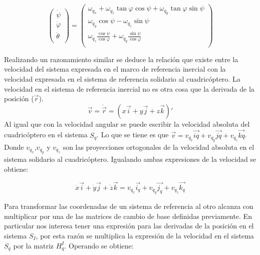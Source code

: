 \documentclass[main]{subfiles}
\begin{document}
\begin{equation}
\left(\begin{array}{c}
\dot{\psi}\\
\dot{\varphi}\\
\dot{\theta}\\
\end{array}\right)=\left(\begin{array}{c}
\omega_{q_x} + \omega_{q_z}\tan\varphi \cos\psi + \omega_{q_y}\tan\varphi \sin\psi\\
\omega_{q_y}\cos \psi - \omega_{q_z}\sin\psi\\
\omega_{q_z} \frac{\cos\psi}{\cos\varphi}  + \omega_{q_y}\frac{\sin\psi}{\cos\varphi} \\
\end{array}\right)
\label{eq:euler}
\end{equation}

Realizando un razonamiento similar se deduce la relaci\'on que existe entre la velocidad del sistema expresada en el marco de referencia inercial con la velocidad expresada en el sistema de referencia solidario al cuadric\'optero. La velocidad en el sistema de referencia inercial no es otra cosa que la derivada de la posici\'on ($\vec{r}$). 
$$
\vec{v}=\dot{\vec{r}}=(x\vec{i}+y\vec{j}+z\vec{k})\prime
$$
Al igual que con la velocidad angular se puede escribir la velocidad absoluta del cuadric\'optero en el sistema $S_q$. Lo que se tiene es que $\vec{v} =v_{q_x}\vec{iq}+v_{q_y}\vec{jq}+v_{q_z}\vec{kq}$. Donde $v_{q_x}$,$v_{q_y}$ y $v_{q_z}$ son las proyecciones ortogonales de la velocidad absoluta en el sistema solidario al cuadric\'optero. Igualando ambas expresiones de la velocidad se obtiene: 

$$
\dot{x}\vec{i}+\dot{y}\vec{j}+\dot{z}\vec{k} = v_{q_x} \vec{i_q}+v_{q_y} \vec{j_q}+v_{q_z} \vec{k_q}
$$

Para transformar las coordenadas de un sistema de referencia al otro alcanza con multiplicar por una de las matrices de cambio de base definidas previamente. En particular nos interesa tener una expresi\'on para las derivadas de la posici\'on en el sistema $S_I$, por esta raz\'on se multiplica la expresi\'on de la velocidad en el sistema $S_q$ por la matriz $H_q^I$. Operando se obtiene:
\end{document}
